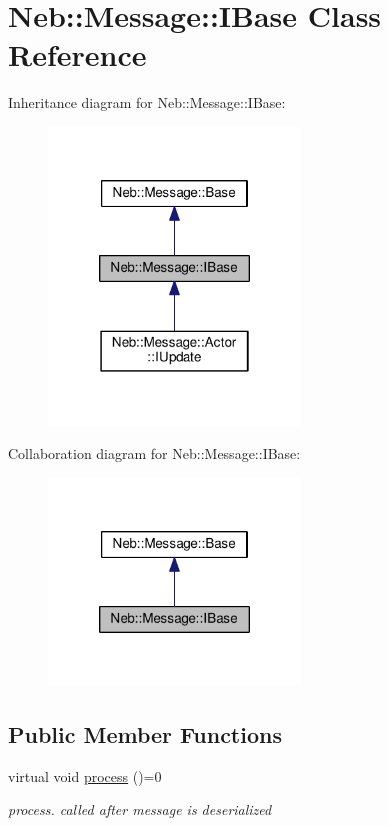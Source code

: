 \hypertarget{classNeb_1_1Message_1_1IBase}{\section{Neb\-:\-:Message\-:\-:I\-Base Class Reference}
\label{classNeb_1_1Message_1_1IBase}
}


Inheritance diagram for Neb\-:\-:Message\-:\-:I\-Base\-:
\nopagebreak
\begin{figure}[H]
\begin{center}
\leavevmode
\includegraphics[width=190pt]{classNeb_1_1Message_1_1IBase__inherit__graph}
\end{center}
\end{figure}


Collaboration diagram for Neb\-:\-:Message\-:\-:I\-Base\-:
\nopagebreak
\begin{figure}[H]
\begin{center}
\leavevmode
\includegraphics[width=190pt]{classNeb_1_1Message_1_1IBase__coll__graph}
\end{center}
\end{figure}
\subsection*{Public Member Functions}
\begin{DoxyCompactItemize}
\item 
\hypertarget{classNeb_1_1Message_1_1IBase_a3552e205d83f5d207f04a12431030c64}{virtual void \hyperlink{classNeb_1_1Message_1_1IBase_a3552e205d83f5d207f04a12431030c64}{process} ()=0}\label{classNeb_1_1Message_1_1IBase_a3552e205d83f5d207f04a12431030c64}

\begin{DoxyCompactList}\small\item\em process. called after message is deserialized \end{DoxyCompactList}\end{DoxyCompactItemize}
